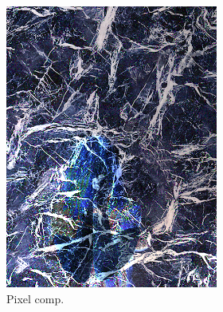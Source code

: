\begin{figure}[]
\begin{subfigure}{\textwidth}
\begin{subfigure}{0.24\textwidth}
            \includegraphics[width=\textwidth]{images/04-experiment02/human/marble/pixel_im.jpg}
            \caption{Pixel comp.}
            \label{fig:ex02-human-marble-pixel_im}
        \end{subfigure}
        \hfill
        \begin{subfigure}{0.24\textwidth}
            \centering

\end{subfigure}
\end{subfigure}
\end{figure}
